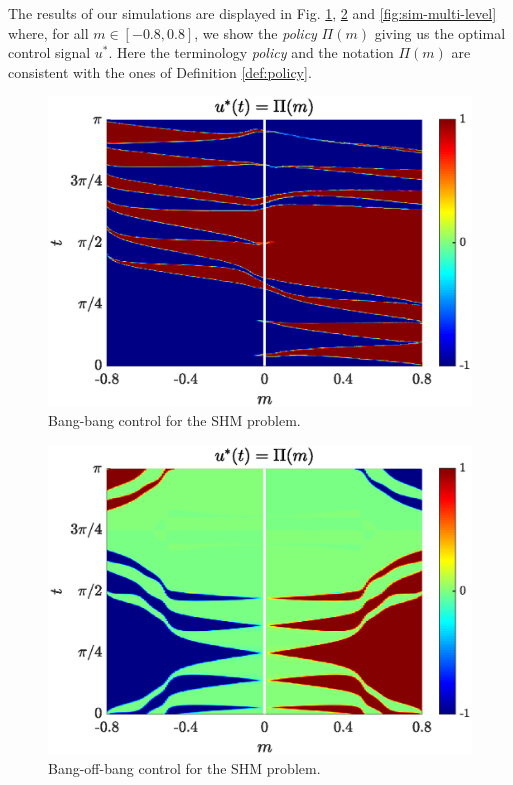 \documentclass[9pt,shortpaper,twoside,web]{ieeecolor}
\begin{document}
The results of our simulations are displayed in Fig. \ref{fig:sim-bang-bang}, \ref{fig:sim-bang-off-bang} and \ref{fig:sim-multi-level} where, for all $m \in [-0.8,0.8]$, we show the \textit{policy} $\Pi(m)$ giving us the optimal control signal $u^\ast$. Here the terminology \textit{policy} and the notation $\Pi(m)$ are consistent with the ones of Definition \ref{def:policy}.

\begin{figure}[ht!]
	\hspace{0.05em}
	\includegraphics[scale=0.525]{img/fig05.eps}
	\caption{Bang-bang control for the SHM problem.}\label{fig:sim-bang-bang}
\end{figure} 

\begin{figure}[ht!]
	\hspace{0.05em}
	\includegraphics[scale=0.525]{img/fig06.eps}
	\caption{Bang-off-bang control for the SHM problem.}\label{fig:sim-bang-off-bang}
\end{figure} 
\end{document}
